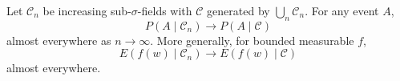 Let $\mathcal{C}_n$ be increasing sub-$\sigma$-fields with $\mathcal{C}$ generated by $\bigcup_n \mathcal{C}_n$. For any event $A$,
$$P(A \mid \mathcal{C}_n) \to P(A \mid \mathcal{C})$$
almost everywhere as $n \to \infty$. More generally, for bounded measurable $f$,
$$E(f(w) \mid \mathcal{C}_n) \to E(f(w) \mid \mathcal{C})$$ almost everywhere.
